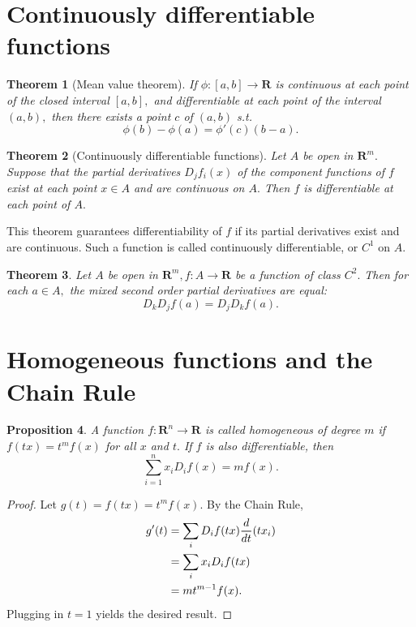 \documentclass[12pt]{article}
\theoremstyle{plain}
\newtheorem{theorem}{Theorem}
\newtheorem{proposition}[theorem]{Proposition}
\theoremstyle{definition}
\theoremstyle{remark}
\renewcommand\frac[2]{\genfrac{}{}{0.6pt}{}{#1}{#2}}
\newcommand{\bR}{\mathbf R}
\newcommand{\0}{\varnothing}
\newcommand{\<}{\langle}
\renewcommand{\>}{\rangle}
\begin{document}
\section{Continuously differentiable functions}

\begin{theorem}[Mean value theorem]
If $ \phi: [a, b] \longrightarrow \bR $ is continuous at each point of the closed interval $ [a, b], $ and differentiable at each point of the interval $ (a, b), $ then there exists a point $ c $ of $ (a, b) $ s.t. $$
  \phi(b) - \phi(a) = \phi'(c) (b - a).
$$
\end{theorem}

\begin{theorem}[Continuously differentiable functions]
  Let $ A $ be open in $ \bR^m. $ Suppose that the partial derivatives $ D_j f_i(x) $ of the component functions of $ f $ exist at each point $ x \in A $ and are continuous on $ A. $ Then $ f $ is differentiable at each point of $ A. $
\end{theorem}

This theorem guarantees differentiability of $ f $ if its partial derivatives exist and are continuous. Such a function is called continuously differentiable, or $ C^1 $ on $ A. $

\begin{theorem}
  Let $ A $ be open in $ \bR^m, f: A \longrightarrow \bR $ be a function of class $ C^2. $ Then for each $ a \in A, $ the mixed second order partial derivatives are equal: $$
    D_k D_j f(a) = D_j D_k f(a).
  $$
\end{theorem}

\break

\section{Homogeneous functions and the Chain Rule}

\begin{proposition}
A function $ f: \bR^n \longrightarrow \bR $ is called homogeneous of degree $ m $ if $ f(tx) = t^m f(x) $ for all $ x $ and $ t. $ If $ f $ is also differentiable, then \[
\sum_{i=1}^n x_i D_i f(x) = m f(x). \tag{1}
\]
\end{proposition}

\begin{proof}
Let $ g(t) = f(tx) = t^m f(x). $ By the Chain Rule, \begin{align*}
g'(t) &= \sum_{i} D_i f(tx) \frac{d}{dt} (tx_i) \\
&= \sum_{i} x_i D_i f(tx) \\
&= m t^{m-1} f(x).
\end{align*}
Plugging in $ t = 1 $ yields the desired result.
\end{proof}
\end{document}
